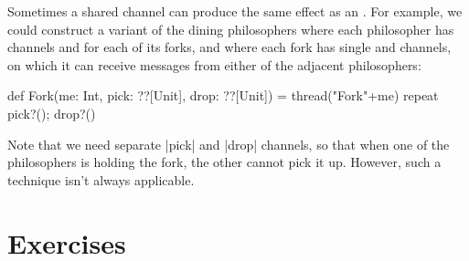 Sometimes a shared channel can produce the same effect as an .  For
example, we could construct a variant of the dining philosophers where each
philosopher has channels  and  for each of its forks,
and where each fork has single  and  channels, on
which it can receive messages from either of the adjacent philosophers:
%
\begin{scala}
  def Fork(me: Int, pick: ??[Unit], drop: ??[Unit]) = thread("Fork"+me){
    repeat{ pick?(); drop?() }
  }
\end{scala}
%
Note that we need separate |pick| and |drop| channels, so that when one of the
philosophers is holding the fork, the other cannot pick it up.  However, such
a technique isn't always applicable. 


\section*{Exercises}
 



